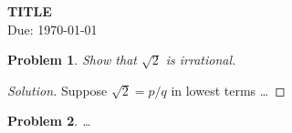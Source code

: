 \documentclass[11pt]{article}
\newtheorem{problem}{Problem}
\newenvironment{solution}{\begin{proof}[Solution]}{\end{proof}}
\begin{document}
\begin{center}{\Large\bfseries {{TITLE}}}\\ Due: \today\end{center}
\begin{problem}
Show that $\sqrt2$ is irrational.
\end{problem}
\begin{solution}
Suppose $\sqrt2=p/q$ in lowest terms \dots
\end{solution}
\begin{problem}
\dots
\end{problem}
\end{document}
